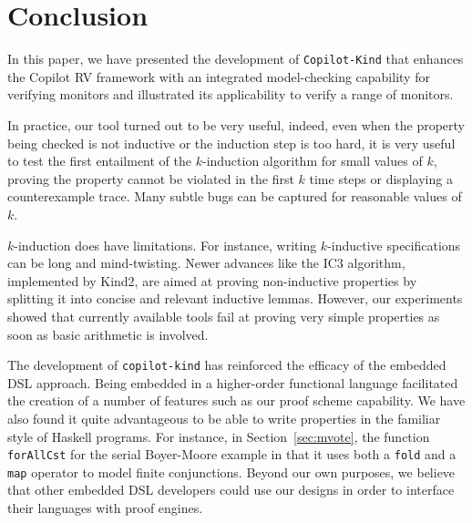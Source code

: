 \section{Conclusion}\label{sec:conclusion}

In this paper, we have presented the development of
\texttt{Copilot-Kind} that enhances the Copilot RV framework with an
integrated model-checking capability for verifying monitors and
illustrated its applicability to verify a range of monitors.

In practice, our tool turned out to be very useful, indeed, even when
the property being checked is not inductive or the induction step is
too hard, it is very useful to test the first entailment of the
$k$-induction algorithm for small values of $k$, proving the property
cannot be violated in the first $k$ time steps or displaying a
counterexample trace. Many subtle bugs can be captured for reasonable
values of $k$. 

$k$-induction does have limitations. For instance, writing $k$-inductive
specifications can be long and mind-twisting. Newer advances like the
\textsc{IC}3 algorithm, implemented by Kind2, are aimed at proving
non-inductive properties by splitting it into concise and relevant
inductive lemmas. However, our experiments showed that currently
available tools fail at proving very simple properties as soon as
basic arithmetic is involved.

The development of \texttt{copilot-kind} has reinforced the efficacy
of the embedded DSL approach. Being embedded in a higher-order
functional language facilitated the creation of a number of features
such as our proof scheme capability. We have also found it quite
advantageous to be able to write properties in the familiar style of
Haskell programs. For instance, in Section~\ref{sec:mvote}, the
function \texttt{forAllCst} for the serial Boyer-Moore example in that
it uses both a \texttt{fold} and a \texttt{map} operator to model
finite conjunctions.  Beyond our own purposes, we believe that other
embedded DSL developers could use our designs in order to interface
their languages with proof engines.


